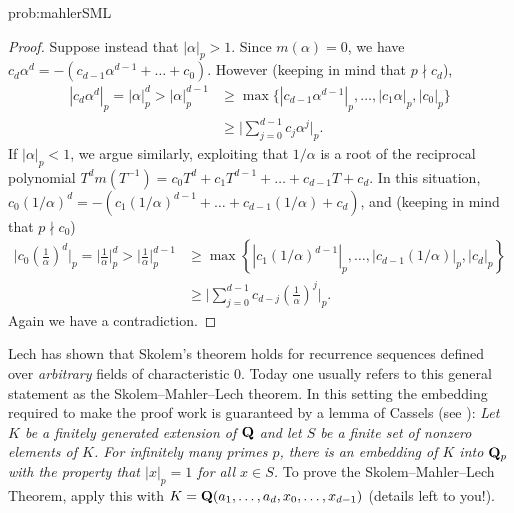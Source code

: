 \begin{sol}{prob:mahlerSML}
\begin{proof}
Suppose instead  that $|\alpha|_p > 1$. Since $m(\alpha)=0$, we have $c_d \alpha^d = -(c_{d-1} \alpha^{d-1} + \dots + c_0)$. However (keeping in mind that $p\nmid c_d$), 
\begin{align*} |c_d \alpha^d|_p = |\alpha|_p^d > |\alpha|_p^{d-1} &\ge \max\{|c_{d-1}\alpha^{d-1}|_p, \dots, |c_1 \alpha|_p, |c_0|_p\}\\
&\ge \bigg|\sum_{j=0}^{d-1} c_j \alpha^j\bigg|_p. 
\end{align*}
If $|\alpha|_p < 1$, we argue similarly, exploiting that $1/\alpha$ is a root of the \textsf{reciprocal polynomial} $T^{d} m(T^{-1}) = c_0 T^d + c_1 T^{d-1} + \dots + c_{d-1} T + c_d$. In this situation, $c_0 (1/\alpha)^d = -(c_1 (1/\alpha)^{d-1} + \dots + c_{d-1}(1/\alpha) + c_d)$, and (keeping in mind that $p\nmid c_0$)
\begin{align*} \bigg|c_0 \left(\frac1\alpha\right)^d\bigg|_p = \bigg|\frac1\alpha\bigg|_p^d > \bigg|\frac1\alpha\bigg|_p^{d-1} &\ge \max\left\{|c_{1}(1/\alpha)^{d-1}|_p, \dots, |c_{d-1} (1/\alpha)|_p, |c_d|_p\right\} \\
&\ge \bigg|\sum_{j=0}^{d-1} c_{d-j} \left(\frac{1}{\alpha}\right)^j\bigg|_p. 
\end{align*}
Again we have a contradiction.\end{proof}

\begin{rmk} 
Lech has shown that Skolem's theorem holds for recurrence sequences defined over \emph{arbitrary} fields of characteristic $0$. Today one usually refers to this general statement as the \textsf{Skolem--Mahler--Lech theorem}. In this setting the embedding required to make the proof work is guaranteed by a lemma of Cassels (see \cite[Chapter 5]{cassels86}):  \emph{Let $K$ be a finitely generated extension of $\mathbf{Q}$ and let $S$ be a finite set of nonzero elements of $K$. For infinitely many primes $p$, there is an embedding of $K$ into $\mathbf{Q}_p$  with the property that $|x|_p = 1$ for all $x \in S$.} To prove the Skolem--Mahler--Lech Theorem, apply this with $K = \mathbf{Q}(a_1,\dots,a_d,x_0,\dots,x_{d-1})$ (details left to you!).
\end{rmk}

\end{sol}

